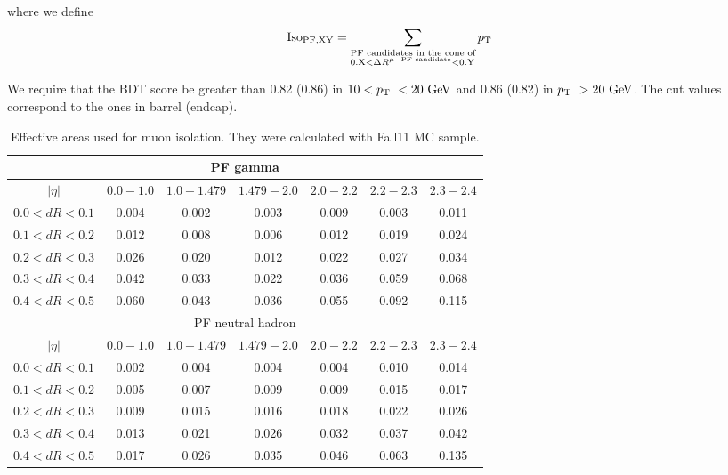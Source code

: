 where we define 
\begin{eqnarray} 
\textrm{Iso}_\textrm{PF,XY} 
= 
\sum_{
\begin{subarray}{l}
\textrm{PF candidates in the cone of} \\
\textrm{0.X}   < \Delta R^{\mu-\textrm{PF candidate}} < \textrm{0.Y} 
    \end{subarray} }
p_\mathrm{T}
\end{eqnarray} 

We require that the BDT score be greater than 0.82 (0.86) in $10<p_\mathrm{T}~<20~\mathrm{Ge\kern -0.1em V}$ 
and 0.86 (0.82) in $p_\mathrm{T}~>20~\mathrm{Ge\kern -0.1em V}$. The cut values correspond to the ones in barrel (endcap).

\begin{table}[htp]
	\centering
    \footnotesize
	\label{tab:muAeff} 
    \vspace{0.5cm} 
    \caption{ Effective areas used for muon isolation. They were calculated with Fall11 MC sample.}
    \vspace{0.5cm} 
		\begin{tabular}{c|c|c|c|c|c|c}
			\hline 
				\multicolumn{7}{c}{PF gamma} \\
	  	    \hline
			 	$|\eta|$     & $0.0 - 1.0$ & $1.0 - 1.479$ & $1.479 - 2.0$ & $2.0 - 2.2$ & $2.2 - 2.3$ & $2.3-2.4$ \\       		
	  	    \hline \hline
				$0.0<dR<0.1$ & 0.004& 0.002& 0.003& 0.009& 0.003& 0.011 \\
				$0.1<dR<0.2$ & 0.012& 0.008& 0.006& 0.012& 0.019& 0.024 \\
				$0.2<dR<0.3$ & 0.026& 0.020& 0.012& 0.022& 0.027& 0.034 \\
				$0.3<dR<0.4$ & 0.042& 0.033& 0.022& 0.036& 0.059& 0.068 \\
				$0.4<dR<0.5$ & 0.060& 0.043& 0.036& 0.055& 0.092& 0.115 \\
	  	    \hline \hline 
				\multicolumn{7}{c}{PF neutral hadron} \\
	  	    \hline 
			 	$|\eta|$     & $0.0 - 1.0$ & $1.0 - 1.479$ & $1.479 - 2.0$ & $2.0 - 2.2$ & $2.2 - 2.3$ & $2.3-2.4$ \\       		
	  	    \hline \hline
				$0.0<dR<0.1$ & 0.002& 0.004& 0.004& 0.004& 0.010& 0.014 \\
			    $0.1<dR<0.2$ & 0.005& 0.007& 0.009& 0.009& 0.015& 0.017 \\
			    $0.2<dR<0.3$ & 0.009& 0.015& 0.016& 0.018& 0.022& 0.026 \\ 
				$0.3<dR<0.4$ & 0.013& 0.021& 0.026& 0.032& 0.037& 0.042 \\ 
				$0.4<dR<0.5$ & 0.017& 0.026& 0.035& 0.046& 0.063& 0.135 \\ 
			\hline
		\end{tabular}
\end{table}

